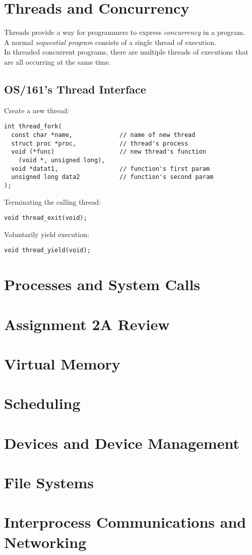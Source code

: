 \documentclass[12pt]{article}
\theoremstyle{plain}
\theoremstyle{definition}
\begin{document}
\newpage
\section{Threads and Concurrency}
Threads provide a way for programmers to express \emph{concurrency} in a program. \\
A normal \emph{sequential program} consists of a single thread of execution. \\
In threaded concurrent programs, there are multiple threads of executions that are all occurring at the same time.

\subsection{OS/161's Thread Interface}
Create a new thread:
\begin{verbatim}
int thread_fork(
  const char *name,             // name of new thread
  struct proc *proc,            // thread's process
  void (*func)                  // new thread's function
    (void *, unsigned long),
  void *datat1,                 // function's first param
  unsigned long data2           // function's second param
);
\end{verbatim}

Terminating the calling thread: \\
\begin{verbatim}
void thread_exit(void);
\end{verbatim}

Voluntarily yield execution: \\
\begin{verbatim}
void thread_yield(void);
\end{verbatim}


\newpage
\section{Processes and System Calls}

\newpage
\section{Assignment 2A Review}

\newpage
\section{Virtual Memory}

\newpage
\section{Scheduling}

\newpage
\section{Devices and Device Management}

\newpage
\section{File Systems}

\newpage
\section{Interprocess Communications and Networking}

\clearpage
\printindex
\end{document}

